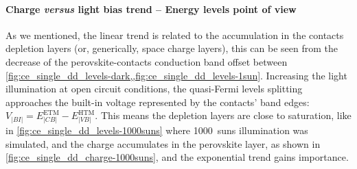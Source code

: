 		\paragraph{Charge \textsl{versus} light bias trend -- Energy levels point of view}\label{ce_energy_levels}
		As we mentioned, the linear trend is related to the accumulation in the contacts depletion layers (or, generically, space charge layers), this can be seen from the decrease of the perovskite-contacts conduction band offset between \cref{fig:ce_single_dd_levels-dark,,fig:ce_single_dd_levels-1sun}.
		Increasing the light illumination at open circuit conditions, the quasi-Fermi levels splitting approaches the built-in voltage represented by the contacts' band edges: $V_|BI| = E_|CB|^{\mathrm{ETM}} - E_|VB|^{\mathrm{HTM}}$.
		This means the depletion layers are close to saturation, like in \cref{fig:ce_single_dd_levels-1000suns} where \SI{1000}{suns} illumination was simulated, and the charge accumulates in the perovskite layer, as shown in \cref{fig:ce_single_dd_charge-1000suns}, and the exponential trend gains importance.

					\begin{figure}
		\end{figure}

